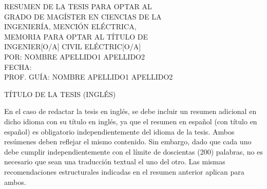\newpage

\noindent\hfill
\begin{minipage}[t]{0.6\textwidth}
    RESUMEN DE LA TESIS PARA OPTAR AL \\
    GRADO DE MAGÍSTER EN CIENCIAS DE LA \\ INGENIERÍA, MENCIÓN ELÉCTRICA, \\
    MEMORIA PARA OPTAR AL TÍTULO DE \\ INGENIER[O/A] CIVIL ELÉCTRIC[O/A] \\
    {POR: NOMBRE APELLIDO1 APELLIDO2} \\
    {FECHA: \the\year} \\
    {PROF. GUÍA: NOMBRE APELLIDO1 APELLIDO2} \\
\end{minipage}

\begin{center}
    TÍTULO DE LA TESIS (INGLÉS)
\end{center}

\noindent En el caso de redactar la tesis en inglés, se debe incluir un resumen adicional en dicho idioma con su título en inglés, ya que el resumen en español (con título en español) es obligatorio independientemente del idioma de la tesis. Ambos resúmenes deben reflejar el mismo contenido. Sin embargo, dado que cada uno debe cumplir independientemente con el límite de doscientas (200) palabras, no es necesario que sean una traducción textual el uno del otro. Las mismas recomendaciones estructurales indicadas en el resumen anterior aplican para ambos.